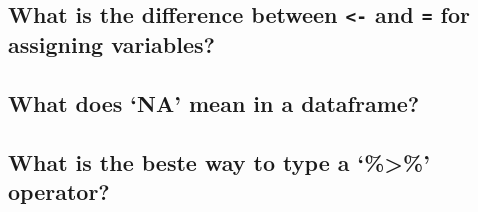 \documentclass[
]{book}
\begin{document}
\hypertarget{what-is-the-difference-between---and-for-assigning-variables}{%
\subsection*{\texorpdfstring{What is the difference between \texttt{\textless{}-} and \texttt{=} for assigning variables?}{What is the difference between \textless- and = for assigning variables?}}\label{what-is-the-difference-between---and-for-assigning-variables}}

\hypertarget{what-does-na-mean-in-a-dataframe}{%
\subsection*{What does `NA' mean in a dataframe?}\label{what-does-na-mean-in-a-dataframe}}

\hypertarget{what-is-the-beste-way-to-type-a-operator}{%
\subsection*{What is the beste way to type a `\%\textgreater\%' operator?}\label{what-is-the-beste-way-to-type-a-operator}}

\hypertarget{section}{%
\subsection*{}\label{section}}

\hypertarget{section-1}{%
\subsection*{}\label{section-1}}

\hypertarget{section-2}{%
\subsection*{}\label{section-2}}

\hypertarget{section-3}{%
\subsection*{}\label{section-3}}
\end{document}
